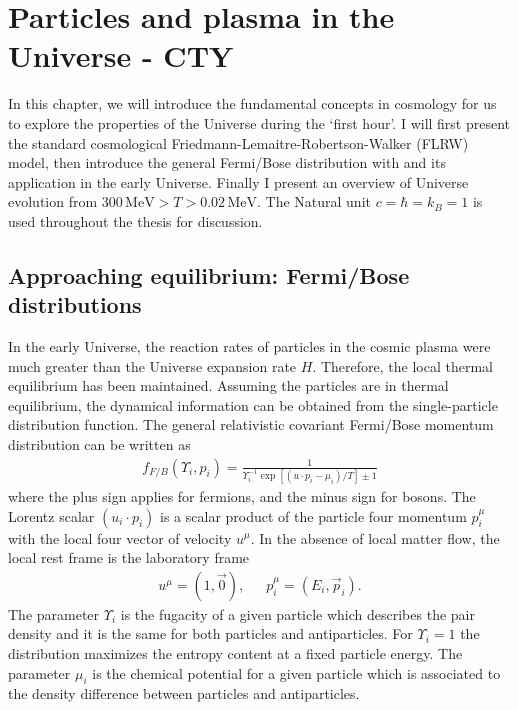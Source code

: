 \section{Particles and plasma in the Universe - CTY}\label{Introduction}
In this chapter, we will introduce the fundamental concepts in cosmology for us to explore the properties of the Universe during the `first hour'. I will first present the standard cosmological Friedmann-Lemaitre-Robertson-Walker (FLRW) model, then introduce the general Fermi/Bose distribution with and its application in the early Universe. Finally I present an overview of Universe evolution from $300\,\mathrm{MeV}>T>0.02\,\mathrm{MeV}$.
The Natural unit $c=\hbar=k_{B}=1$ is used throughout the thesis for discussion.



\subsection{Approaching equilibrium: Fermi/Bose distributions}

In the early Universe, the reaction rates of particles in the cosmic plasma were much greater than the Universe expansion rate $H$. Therefore, the local thermal equilibrium has been maintained. Assuming the particles are in thermal equilibrium, the dynamical information can be obtained from the single-particle distribution function. The general relativistic covariant Fermi/Bose momentum distribution can be written as
\begin{align}
f_{F/B}(\Upsilon_i,p_i)=\frac{1}{\Upsilon^{-1}_i\exp{\left[(u\cdot p_i-\mu_i)/T\right]}\pm1}
\end{align}
where the plus sign applies for fermions, and the minus sign for bosons. The Lorentz scalar $(u_i\cdot p_i)$ is a scalar product of the particle four momentum $p^\mu_i$ with the local four vector of velocity $u^\mu$. In the absence of local matter flow, the local rest frame is the laboratory frame 
\begin{align}
u^\mu=\left(1,\vec{0}\right),\,\,\,\,\,\,\,\,\, p^\mu_i=\left(E_i,\vec{p}_i\right).
\end{align}  
The parameter $\Upsilon_i$ is the fugacity of a given particle which describes the pair density and it is the same for both particles and antiparticles. For $\Upsilon_i=1$ the distribution maximizes the entropy content at a fixed particle energy. The parameter $\mu_i$ is the chemical potential for a given particle which is associated to the density difference between particles and antiparticles. 

